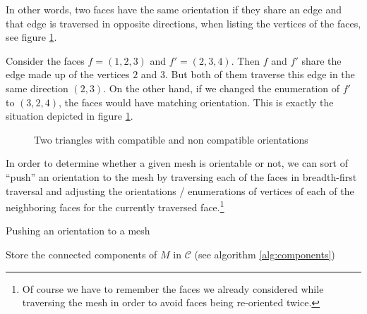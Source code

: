 In other words, two faces have the same orientation if they share an edge and that edge is traversed in opposite directions, when listing the vertices of the faces, see figure \ref{fig:orientation}.
\begin{ex}
    Consider the faces $f = (1, 2, 3)$ and $f' = (2, 3, 4)$. Then $f$ and $f'$ share the edge made up of the vertices $2$ and $3$. But both of them traverse this edge in the same direction $(2,3)$. On the other hand, if we changed the enumeration of $f'$ to $(3, 2, 4)$, the faces would have matching orientation. This is exactly the situation depicted in figure \ref{fig:orientation}.
\end{ex}
\begin{figure}[t]
    \centering
    \caption{Two triangles with compatible and non compatible orientations}
    \label{fig:orientation}
\end{figure}
In order to determine whether a given mesh is orientable or not, we can sort of ``push'' an orientation to the mesh by traversing each of the faces in breadth-first traversal and adjusting the orientations / enumerations of vertices of each of the neighboring faces for the currently traversed face.\footnote{Of course we have to remember the faces we already considered while traversing the mesh in order to avoid faces being re-oriented twice.}
\begin{algorithm}

    \caption{Pushing an orientation to a mesh}
    \label{alg:pushorientation}
    Store the connected components of $M$ in $\mathcal{C}$ (see algorithm \ref{alg:components})\;
\end{algorithm}
